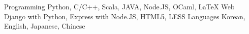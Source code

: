\begin{cvskills}
  \cvskill
    {Programming}
    {Python, C/C++, Scala, JAVA, Node.JS, OCaml, LaTeX}
  \cvskill
    {Web}
    {Django with Python, Express with Node.JS, HTML5, LESS}
  \cvskill
    {Languages}
    {Korean, English, Japanese, Chinese}
\end{cvskills}
